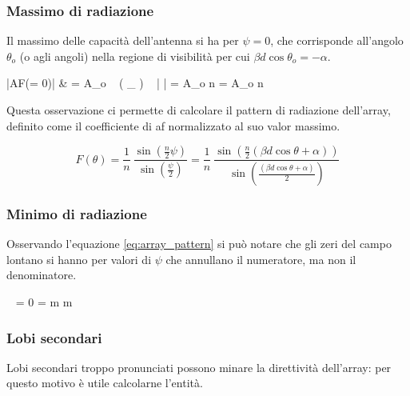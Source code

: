 		\subsubsection{Massimo di radiazione}
			Il massimo delle capacità dell'antenna si ha per $\psi = 0$, che corrisponde all'angolo $\theta_o$ (o agli angoli) nella regione di visibilità per cui $\beta d \cos \theta_o = -\alpha$.
			
			\begin{esp}
				|AF(\psi = 0)| 
					& = A_o 
						~ \left( \lim_{\psi {}} \frac{ \sin(\frac{n}{2} \psi) }{ \sin(\frac{\psi}{2}) } \right)
						~ \left| \frac{ e^{\jmath \frac{n-1}{2} \psi} }{ e^{\jmath \psi} } \right| 
						= A_o \cdot n \cdot 1 = A_o \cdot n
			\end{esp}

			Questa osservazione ci permette di calcolare il pattern di radiazione dell'array, definito come il coefficiente di \gls{af} normalizzato al suo valor massimo.
			
			\begin{equation} \label{eq:array_pattern}
				F(\theta) 
					= \frac{1}{n} ~ 
					= \frac{1}{n} ~ \frac{
						\sin \left(
							\frac{n}{2} (\beta d \cos \theta + \alpha)
						\right) 
					}{
						\sin \left(
							\frac{(\beta d \cos \theta + \alpha)}{2}
						\right)
					}
			\end{equation}
			
		\subsubsection{Minimo di radiazione}
			Osservando l'equazione \ref{eq:array_pattern} si può notare che gli zeri del campo lontano si hanno per valori di $\psi$ che annullano il numeratore, ma non il denominatore.
			
			\begin{esp}
				 ~ \frac{\sin(\frac{n}{2} \psi) }{ \sin( \frac{\psi}{2} ) } = 0
				\Leftrightarrow 
					 \psi = \pm m \pi \quad \forall m \neq 0
			\end{esp}
			
		\subsubsection{Lobi secondari}
			Lobi secondari troppo pronunciati possono minare la direttività dell'array: per questo motivo è utile calcolarne l'entità.
			
